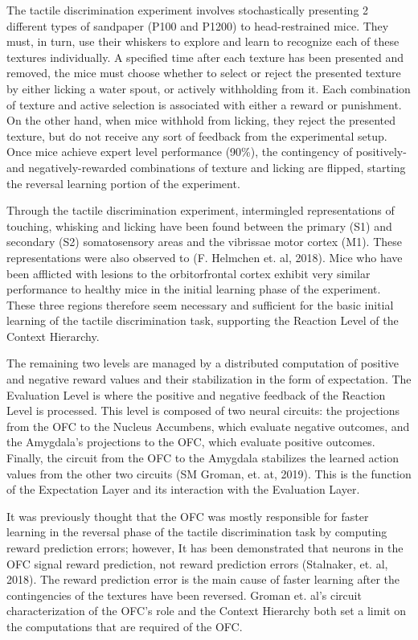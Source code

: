 \documentclass[]{article}
\begin{document}
The tactile discrimination experiment involves stochastically presenting 2 different types of sandpaper (P100 and P1200) to head-restrained mice.  They must, in turn, use their whiskers to explore and learn to recognize each of these textures individually.  A specified time after each texture has been presented and removed, the mice must choose whether to select or reject the presented texture by either licking a water spout, or actively withholding from it.  Each combination of texture and active selection is associated with either a reward or punishment.  On the other hand, when mice withhold from licking, they reject the presented texture, but do not receive any sort of feedback from the experimental setup.  Once mice achieve expert level performance (90\%), the contingency of positively- and negatively-rewarded combinations of texture and licking are flipped, starting the reversal learning portion of the experiment.

Through the tactile discrimination experiment, intermingled representations of touching, whisking and licking have been found between the primary (S1) and secondary (S2) somatosensory areas and the vibrissae motor cortex (M1).  These representations were also observed to (F. Helmchen et. al, 2018).  Mice who have been afflicted with lesions to the orbitorfrontal cortex exhibit very similar performance to healthy mice in the initial learning phase of the experiment.  These three regions therefore seem necessary and sufficient for the basic initial learning of the tactile discrimination task, supporting the Reaction Level of the Context Hierarchy.

The remaining two levels are managed by a distributed computation of positive and negative reward values and their stabilization in the form of expectation.  The Evaluation Level is where the positive and negative feedback of the Reaction Level is processed.  This level is composed of two neural circuits: the projections from the OFC to the Nucleus Accumbens, which evaluate negative outcomes, and the Amygdala's projections to the OFC, which evaluate positive outcomes.  Finally, the circuit from the OFC to the Amygdala stabilizes the learned action values from the other two circuits (SM Groman, et. at, 2019).  This is the function of the Expectation Layer and its interaction with the Evaluation Layer.

It was previously thought that the OFC was mostly responsible for faster learning in the reversal phase of the tactile discrimination task by computing reward prediction errors; however, It has been demonstrated that neurons in the OFC signal reward prediction, not reward prediction errors (Stalnaker, et. al, 2018).  The reward prediction error is the main cause of faster learning after the contingencies of the textures have been reversed.  Groman et. al's circuit characterization of the OFC's role and the Context Hierarchy both set a limit on the computations that are required of the OFC.
\end{document}
